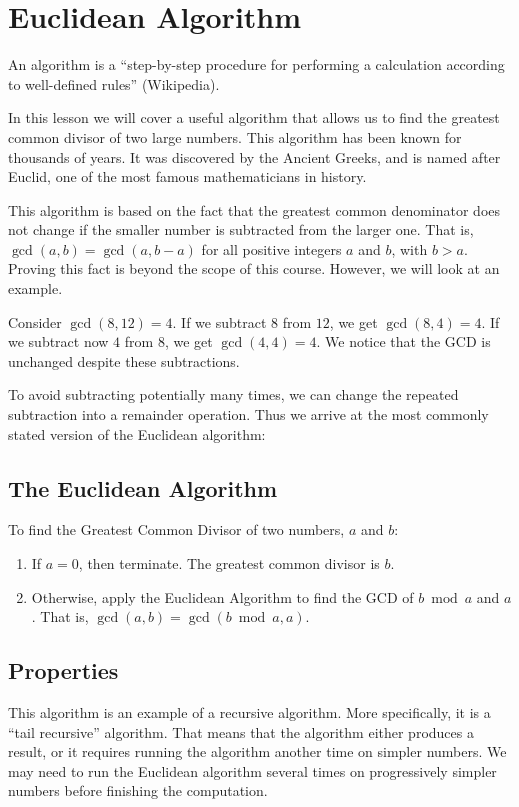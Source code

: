 \documentclass[a4paper,10pt]{report}
\begin{document}
\section{Euclidean Algorithm}

An \gls{algorithm} is a ``step-by-step procedure for performing a calculation
according to well-defined rules'' (Wikipedia).

In this lesson we will cover a useful algorithm that allows us to find the
greatest common divisor of two large numbers. This algorithm has been known for
thousands of years. It was discovered by the Ancient Greeks, and is named after
Euclid, one of the most famous mathematicians in history.

This algorithm is based on the fact that the greatest common denominator does
not change if the smaller number is subtracted from the larger one. That is,
\(\gcd(a, b) = \gcd(a, b - a)\) for all positive integers \(a\) and \(b\), with
\(b>a\). Proving this fact is beyond the scope of this course. However, we will
look at an example.

Consider \(\gcd(8, 12)=4\). If we subtract \(8\) from \(12\), we get \(\gcd(8,
4)=4\). If we subtract now \(4\) from \(8\), we get \(\gcd(4, 4)=4\). We notice
that the GCD is unchanged despite these subtractions.

To avoid subtracting potentially many times, we can change the repeated
subtraction into a remainder operation. Thus we arrive at the most commonly
stated version of the Euclidean algorithm:

\subsection{The Euclidean Algorithm}

To find the Greatest Common Divisor of two numbers, \(a\) and \(b\):
\begin{enumerate}
 \item If \(a=0\), then terminate. The greatest common divisor is \(b\).
 \item Otherwise, apply the Euclidean Algorithm to find the GCD of \(b \bmod
 a\) and \(a\). That is, \(\gcd(a, b) = \gcd(b \bmod a, a)\).
\end{enumerate}

\subsection{Properties}

This algorithm is an example of a recursive algorithm. More specifically, it is
a ``tail recursive'' algorithm. That means that the algorithm either produces a
result, or it requires running the algorithm another time on simpler numbers.
We may need to run the Euclidean algorithm several times on progressively
simpler numbers before finishing the computation.
\end{document}
